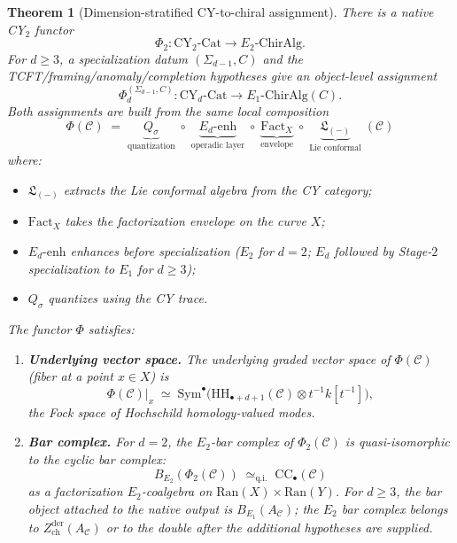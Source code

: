 \documentclass[11pt]{article}
\theoremstyle{plain}
\newtheorem{theorem}{Theorem}[section]
\theoremstyle{definition}
\theoremstyle{remark}
\newcommand{\Eone}{E_1}
\newcommand{\Etwo}{E_2}
\newcommand{\Sym}{\mathrm{Sym}}
\newcommand{\CY}{\mathrm{CY}}
\newcommand{\HH}{\mathrm{HH}}
\newcommand{\Ran}{\mathrm{Ran}}
\newcommand{\Fact}{\mathrm{Fact}}
\newcommand{\cC}{\mathcal{C}}
\newcommand{\frakL}{\mathfrak{L}}
\begin{document}
\begin{theorem}[Dimension-stratified CY-to-chiral assignment]
\label{thm:cy-a}
There is a native CY$_2$ functor
\[
\Phi_2 \colon \CY_2\text{-}\mathrm{Cat} \longrightarrow
\Etwo\text{-}\mathrm{ChirAlg}.
\]
For $d \geq 3$, a specialization datum $(\Sigma_{d-1},C)$ and the
TCFT/framing/anomaly/completion hypotheses give an object-level
assignment
\[
\Phi_d^{(\Sigma_{d-1},C)}
\colon
\CY_d\text{-}\mathrm{Cat}
\longrightarrow
\Eone\text{-}\mathrm{ChirAlg}(C).
\]
Both assignments are built from the same local composition
\begin{equation}
\label{eq:phi-composition}
\Phi(\cC) \;=\; \underbrace{Q_\sigma}_{\text{quantization}} \;\circ\; \underbrace{E_d \text{-}\mathrm{enh}}_{\text{operadic layer}} \;\circ\; \underbrace{\Fact_X}_{\text{envelope}} \;\circ\; \underbrace{\frakL_{(-)}}_{\text{Lie conformal}} \;(\cC)
\end{equation}
where:
\begin{itemize}
\item $\frakL_{(-)}$ extracts the Lie conformal algebra from the CY category;
\item $\Fact_X$ takes the factorization envelope on the curve $X$;
\item $E_d\text{-}\mathrm{enh}$ enhances before specialization
($\Etwo$ for $d=2$; $E_d$ followed by Stage-$2$ specialization to
$\Eone$ for $d \geq 3$);
\item $Q_\sigma$ quantizes using the CY trace.
\end{itemize}

The functor $\Phi$ satisfies:
\begin{enumerate}[label=(\roman*)]
\item \textbf{Underlying vector space.}\; The underlying graded vector space of $\Phi(\cC)$ (fiber at a point $x \in X$) is
\[
\Phi(\cC)|_x \;\simeq\; \Sym^\bullet\bigl(\HH_{\bullet+d+1}(\cC) \otimes t^{-1}k[t^{-1}]\bigr),
\]
the Fock space of Hochschild homology-valued modes.

\item \textbf{Bar complex.}\; For $d=2$, the $\Etwo$-bar complex of $\Phi_2(\cC)$ is quasi-isomorphic to the cyclic bar complex:
\[
B_{\Etwo}(\Phi_2(\cC)) \;\simeq_{\mathrm{q.i.}}\; \mathrm{CC}_\bullet(\cC)
\]
as a factorization $\Etwo$-coalgebra on $\Ran(X) \times \Ran(Y)$. For
$d \geq 3$, the bar object attached to the native output is
$B_{\Eone}(A_\cC)$; the $\Etwo$ bar complex belongs to
$Z^{\mathrm{der}}_{\mathrm{ch}}(A_\cC)$ or to the double after the
additional hypotheses are supplied.


\end{enumerate}
\end{theorem}
\end{document}
